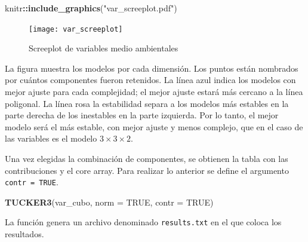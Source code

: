 \documentclass[
  spanish,
]{article}
\newenvironment{Shaded}{\begin{snugshade}}{\end{snugshade}}
\newcommand{\DataTypeTok}[1]{\textcolor[rgb]{0.13,0.29,0.53}{#1}}
\newcommand{\KeywordTok}[1]{\textcolor[rgb]{0.13,0.29,0.53}{\textbf{#1}}}
\newcommand{\NormalTok}[1]{#1}
\newcommand{\OperatorTok}[1]{\textcolor[rgb]{0.81,0.36,0.00}{\textbf{#1}}}
\newcommand{\OtherTok}[1]{\textcolor[rgb]{0.56,0.35,0.01}{#1}}
\newcommand{\StringTok}[1]{\textcolor[rgb]{0.31,0.60,0.02}{#1}}
\begin{document}
\begin{Shaded}
\begin{Highlighting}[]
\NormalTok{knitr}\OperatorTok{::}\KeywordTok{include\_graphics}\NormalTok{(}\StringTok{"var\_screeplot.pdf"}\NormalTok{)}
\end{Highlighting}
\end{Shaded}

\begin{figure}
\texttt{[image: var\_screeplot]} \caption{Screeplot de variables medio ambientales}\label{fig:screeplot}
\end{figure}

La figura muestra los modelos por cada dimensión. Los puntos están nombrados por cuántos componentes fueron retenidos. La línea azul indica los modelos con mejor ajuste para cada complejidad; el mejor ajuste estará más cercano a la línea poligonal. La línea rosa la estabilidad separa a los modelos más estables en la parte derecha de los inestables en la parte izquierda. Por lo tanto, el mejor modelo será el más estable, con mejor ajuste y menos complejo, que en el caso de las variables es el modelo \(3 \times 3 \times 2\).

Una vez elegidas la combinación de componentes, se obtienen la tabla con las contribuciones y el core array. Para realizar lo anterior se define el argumento \texttt{contr\ =\ TRUE}.

\begin{Shaded}
\begin{Highlighting}[]
\KeywordTok{TUCKER3}\NormalTok{(var\_cubo, }\DataTypeTok{norm =} \OtherTok{TRUE}\NormalTok{, }\DataTypeTok{contr =} \OtherTok{TRUE}\NormalTok{)}
\end{Highlighting}
\end{Shaded}

La función genera un archivo denominado \texttt{results.txt} en el que coloca los resultados.
\end{document}
